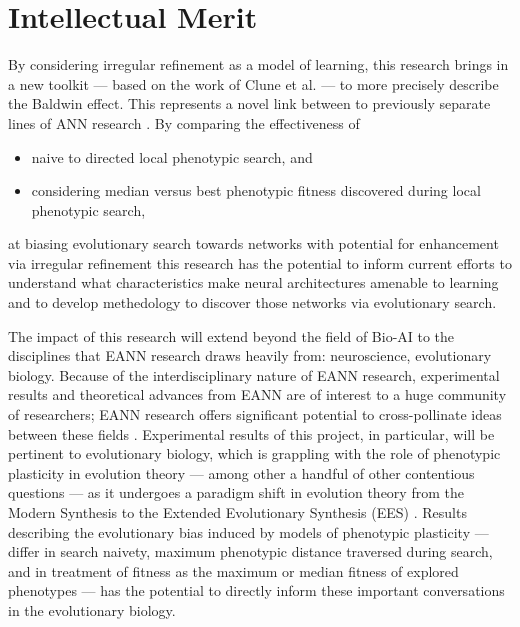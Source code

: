\section{Intellectual Merit}
By considering irregular refinement as a model of learning, this research brings in a new toolkit --- based on the work of Clune et al. \cite{Clune2011OnRegularity} --- to more precisely describe the Baldwin effect. This represents a novel link between to previously separate lines of ANN research \cite{Clune2011OnRegularity,Downing2010TheNetworks}. By comparing the effectiveness of
\begin{itemize}
  \item naive to directed local phenotypic search, and
  \item considering median versus best phenotypic fitness discovered during local phenotypic search,
\end{itemize}
at biasing evolutionary search towards networks with potential for enhancement via irregular refinement this research has the potential to inform current efforts to  understand what characteristics make neural architectures amenable to learning and to develop methedology to discover those networks via evolutionary search.

The impact of this research will extend beyond the field of Bio-AI to the disciplines that EANN research draws heavily from: neuroscience, evolutionary biology. Because of the interdisciplinary nature of EANN research, experimental results and theoretical advances from EANN are of interest to a huge community of researchers; EANN research offers significant potential to cross-pollinate ideas between these fields \cite{Pigliucci2008IsEvolvable, MoczekTheInnovation, MouretImportingGanglia}. Experimental results of this project, in particular, will be pertinent to evolutionary biology, which is grappling with the role of phenotypic plasticity in evolution theory --- among other a handful of other contentious questions --- as it undergoes a paradigm shift in evolution theory from the Modern Synthesis to the Extended Evolutionary Synthesis (EES) \cite{Pigliucci2008IsEvolvable}. Results describing the evolutionary bias induced by models of phenotypic plasticity --- differ in search naivety, maximum phenotypic distance traversed  during search, and in treatment of fitness as the maximum or median fitness of explored phenotypes --- has the potential to directly inform these important conversations in the evolutionary biology. 

